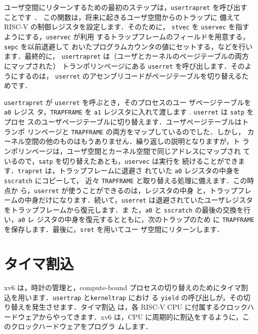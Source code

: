 ユーザ空間にリターンするための最初のステップは，\texttt{usertrapret} を呼び出す
ことです
．
この関数は，将来に起きるユーザ空間からのトラップに
備えて RISC-V の制御レジスタを設定します．そのために，
\texttt{stvec} を \texttt{uservec} を指すようにする，\texttt{uservec} が利用
するトラップフレームのフィールドを用意する，\texttt{sepc} を以前退避して
おいたプログラムカウンタの値にセットする，などを行います．最終的に，
\texttt{usertrapret} は（ユーザとカーネルのページテーブルの両方にマップされた）
トランポリンページにある \texttt{userret} を呼び出します．そのようにするのは，
\texttt{userret} のアセンブリコードがページテーブルを切り替えるためです．

\texttt{usertrapret} が \texttt{userret} を呼ぶとき，そのプロセスのユー
ザページテーブルを \texttt{a0} レジス
タ，\texttt{TRAPFRAME} を \texttt{a1} レジスタに入れて渡します
.
\texttt{userret} は \texttt{satp} をプロセ
スのユーザページテーブルに切り替えます．ユーザページテーブルはトランポ
リンページと \texttt{TRAPFRAME} の両方をマップしているのでした．しかし，
カーネル空間の他のものはもうありません．繰り返しの説明となりますが，ト
ランポリンページは，ユーザ空間とカーネル空間で同じアドレスにマップされ
ているので，\texttt{satp} を切り替えたあとも，\texttt{uservec} は実行を
続けることができます．\texttt{trapret} は，トラップフレームに退避さ
れていた \texttt{a0} レジスタの中身を \texttt{sscratch} にコピーして，
近々 \texttt{TRAPFRAME} と取り替える処理に備えます．この時点か
ら，\texttt{userret} が使うことができるのは，レジスタの中身
と，トラップフレームの中身だけになります．続いて，\texttt{userret}
は退避されていたユーザレジスタをトラップフレームから復元します．ま
た，\texttt{a0} と \texttt{sscratch} の最後の交換を行い，\texttt{a0} レ
ジスタの中身を復元するとともに，次のトラップのため
に \texttt{TRAPFRAME} を保存します．最後に，\texttt{sret} を用いてユー
ザ空間にリターンします．


\section{タイマ割込}

xv6 は，時計の管理と，compute-bound プロセスの切り替えのためにタイマ割
込を用います．\texttt{usertrap} と\texttt{kerneltrap} におけ
る \texttt{yield} の呼び出しが，その切り替えを発生させます．タイマ割込
は，各 RISC-V CPU に付属するクロックハードウェアからやってきます．xv6
は，CPU に周期的に割込をするように，このクロックハードウェアをプログラ
ムします．

